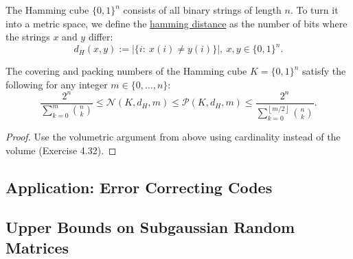 \begin{definition}[]
\label{def:4.2.14} 
The Hamming cube $\{0, 1\}^n$ consists of all binary strings of length $n$. To turn it into a metric space, 
we define the \underline{hamming distance} as the number of bits where the strings $x$ and $y$ differ:
\[ d_H(x, y) := |\{i: \ x(i) \neq y(i) \}|, \ x, y \in \{0, 1\}^n. \]
\end{definition}

\begin{proposition}
The covering and packing numbers of the Hamming cube $K = \{0, 1\}^n$ satisfy the following for any integer 
$m \in \{0, \dots, n\}$: 
\[ \frac{2^n}{\sum_{k = 0}^{m} \binom{n}{k}} \leq \mathcal{N}(K, d_H, m) 
\leq \mathcal{P}(K, d_H, m) \leq \frac{2^n}{\sum_{k = 0}^{\left\lfloor m/2 \right\rfloor} \binom{n}{k}}. \]
\end{proposition}

\begin{proof}
Use the volumetric argument from above using cardinality instead of the volume (Exercise 4.32).
\end{proof}



\subsection{Application: Error Correcting Codes}



\subsection{Upper Bounds on Subgaussian Random Matrices}


